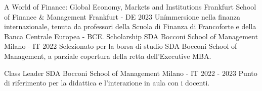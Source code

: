 
\begin{cventries}
  \cventry
  {A World of Finance: Global Economy, Markets and Institutions} %
  {Frankfurt School of Finance \& Management} %
  {}
  {Frankfurt - DE} %
  {2023} %
  {
    Un\'immersione nella finanza internazionale, tenuta da professori della Scuola di Finanza di Francoforte e della Banca Centrale Europea - BCE.
  }
  \cventry
    {Scholarship} %
    {SDA Bocconi School of Management} %
    {}
    {Milano - IT} %
    {2022} %
    {
      Selezionato per la borsa di studio SDA Bocconi School of Management, a parziale copertura della retta dell'Executive MBA.    }
    
  \cventry
  {Class Leader} %
  {SDA Bocconi School of Management} %
  {}
  {Milano - IT} %
  {2022 - 2023} %
  {
    Punto di riferimento per la didattica e l'interazione in aula con i docenti.
  }
\end{cventries}